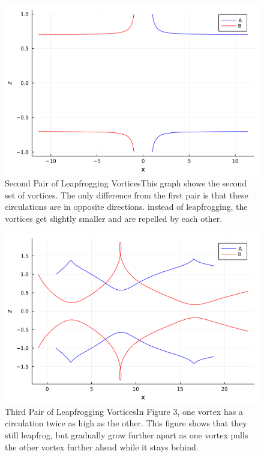 \documentclass{article}
\begin{document}
\begin{figure}[htb]
	\centering
	\includegraphics[width=\textwidth]{Graph_B.png}
	\caption{Second Pair of Leapfrogging Vortices\newline     This graph shows the second set of vortices. The only difference from the first pair is that these circulations are in opposite directions. instead of leapfrogging, the vortices get slightly smaller and are repelled by each other.}
	\label{fig:vortexpaths}
\end{figure} 

\begin{figure}[htb]
	\centering
	\includegraphics[width=\textwidth]{Graph_C.png}
	\caption{Third Pair of Leapfrogging Vortices\newline     In Figure 3, one vortex has a circulation twice as high as the other. This figure shows that they still leapfrog, but gradually grow further apart as one vortex pulls the other vortex further ahead while it stays behind.}
	\label{fig:vortexpaths}
\end{figure} 
\end{document}
